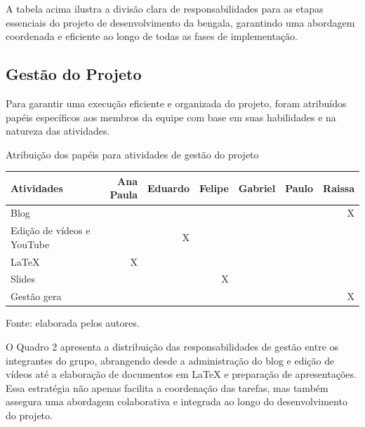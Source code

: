     A tabela acima ilustra a divisão clara de responsabilidades para as etapas essenciais do projeto de desenvolvimento da bengala, garantindo uma abordagem coordenada e eficiente ao longo de todas as fases de implementação.
   
    \subsection{Gestão do Projeto}
    Para garantir uma execução eficiente e organizada do projeto, foram atribuídos papéis específicos aos membros da equipe com base em suas habilidades e na natureza das atividades. 
        \begin{quadro}[!ht]    
            \captionsetup{width=1.0\textwidth} %
            \caption{Atribuição dos papéis para atividades de gestão do projeto}    
            \begin{tabular}{lrrrrrr}
                \toprule
                Atividades & Ana Paula & Eduardo & Felipe & Gabriel & Paulo & Raissa \\
                \midrule
                Blog                                &   &   &   &   &   & X \\
                Edição de vídeos e YouTube          &   & X &   &   &   &   \\
                LaTeX                               & X &   &   &   &   &   \\
                Slides                              &   &   & X &   &   &   \\
                Gestão gera                         &   &   &   &   &   & X \\
                \bottomrule
            \end{tabular}
            \caption*{Fonte: elaborada pelos autores.} %
        \end{quadro}
        O Quadro 2 apresenta a distribuição das responsabilidades de gestão entre os integrantes do grupo, abrangendo desde a administração do blog e edição de vídeos até a elaboração de documentos em LaTeX e preparação de apresentações. Essa estratégia não apenas facilita a coordenação das tarefas, mas também assegura uma abordagem colaborativa e integrada ao longo do desenvolvimento do projeto.



